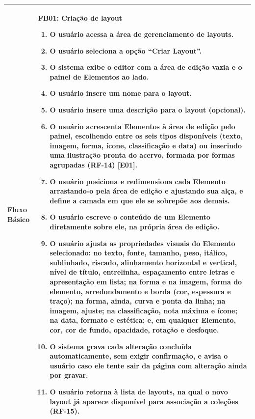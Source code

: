 \begin{longtable}{ >{\raggedright}p{2.8cm} | >{\raggedright\arraybackslash}p{10.7cm} }
Fluxo Básico & \mbox{}
\textbf{FB01:} Criação de layout
\vspace{2pt}
\begin{enumerate}[nosep,leftmargin=1.2em,topsep=0pt,partopsep=0pt,parsep=0pt,itemsep=0pt,after=\vspace{2pt}]
	\item O usuário acessa a área de gerenciamento de layouts.
	\item O usuário seleciona a opção ``Criar Layout''.
	\item O sistema exibe o editor com a área de edição vazia e o painel de Elementos ao lado.
	\item O usuário insere um nome para o layout.
	\item O usuário insere uma descrição para o layout (opcional).
	\item O usuário acrescenta Elementos à área de edição pelo painel, escolhendo entre os seis tipos disponíveis (texto, imagem, forma, ícone, classificação e data) ou inserindo uma ilustração pronta do acervo, formada por formas agrupadas (RF-14) [E01].
	\item O usuário posiciona e redimensiona cada Elemento arrastando-o pela área de edição e ajustando sua alça, e define a camada em que ele se sobrepõe aos demais.
	\item O usuário escreve o conteúdo de um Elemento diretamente sobre ele, na própria área de edição.
	\item O usuário ajusta as propriedades visuais do Elemento selecionado: no texto, fonte, tamanho, peso, itálico, sublinhado, riscado, alinhamento horizontal e vertical, nível de título, entrelinha, espaçamento entre letras e apresentação em lista; na forma e na imagem, forma do elemento, arredondamento e borda (cor, espessura e traço); na forma, ainda, curva e ponta da linha; na imagem, ajuste; na classificação, nota máxima e ícone; na data, formato e estética; e, em qualquer Elemento, cor, cor de fundo, opacidade, rotação e desfoque.
	\item O sistema grava cada alteração concluída automaticamente, sem exigir confirmação, e avisa o usuário caso ele tente sair da página com alteração ainda por gravar.
	\item O usuário retorna à lista de layouts, na qual o novo layout já aparece disponível para associação a coleções (RF-15).
\end{enumerate}
\mbox{} \\ \hline


\end{longtable}
